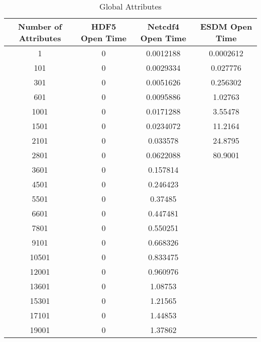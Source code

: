 \begin{table}[H]
\centering
\begin{tabular}{|c|c|c|c|}
\hline
Number of Attributes  & HDF5 Open Time & Netcdf4 Open Time & ESDM Open Time \\ \hline \hline
1                     &  0                  &   0.0012188                    &      0.0002612           \\ \hline
101                   &   0                 &   0.0029334                    &      0.027776            \\ \hline
301                   &    0                &   0.0051626                    &      0.256302            \\ \hline
601                   &     0               &   0.0095886                    &      1.02763             \\ \hline
1001                  &      0              &   0.0171288                    &      3.55478             \\ \hline
1501                  &       0             &   0.0234072                    &     11.2164              \\ \hline
2101                  &        0            &   0.033578                     &     24.8795              \\ \hline
2801 & 0 & 0.0622088 & 80.9001 \\ \hline
3601 & 0 & 0.157814 & \\ \hline
4501 & 0 & 0.246423 & \\ \hline
5501 & 0 & 0.37485 & \\ \hline
6601 & 0 & 0.447481 & \\ \hline
7801 & 0 & 0.550251 & \\ \hline
9101 & 0 & 0.668326 & \\ \hline
10501 & 0 & 0.833475 & \\ \hline
12001 & 0 & 0.960976 & \\ \hline
13601 & 0 & 1.08753 & \\ \hline
15301 & 0 & 1.21565 & \\ \hline
17101 & 0 & 1.44853 & \\ \hline
19001 & 0 & 1.37862 & \\ \hline
\hline
\end{tabular}
\caption{\label{tab:global} Global Attributes}
\end{table}

